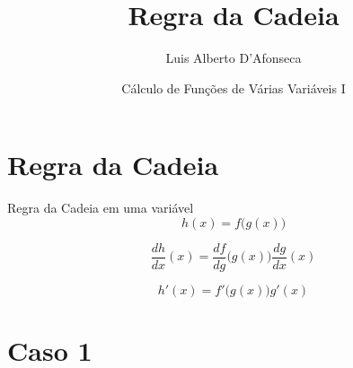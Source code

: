 
\usepackage{apresentacao}
\usepackage{mathconfig}
\usepackage{tabto}


\setcounter{exemplo}{0}

\makeatletter
\graphicspath  {{./figs/}}
\makeatother

\newcommand{\D}[2]{\frac{\partial {#1}}{\partial {#2}}}

\title {Regra da Cadeia}
\author{\large Luis Alberto D'Afonseca}
\date  {Cálculo de Funções de Várias Variáveis I}



\begin{frame}
    \titlepage
\end{frame}

\section{Regra da Cadeia}

\begin{frame}{Regra da Cadeia em uma variável}
    \[
        h(x) = f\big(g(x)\big)
    \]

    \pause
    \vspace{\baselineskip}
    \[
        \frac{dh}{dx}(x) = \frac{df}{dg}\big(g(x)\big)\frac{dg}{dx}(x)
    \]

    \pause
    \vspace{\baselineskip}
    \[
        h'(x) = f'\big(g(x)\big) g'(x)
    \]
\end{frame}

\section{Caso 1}

